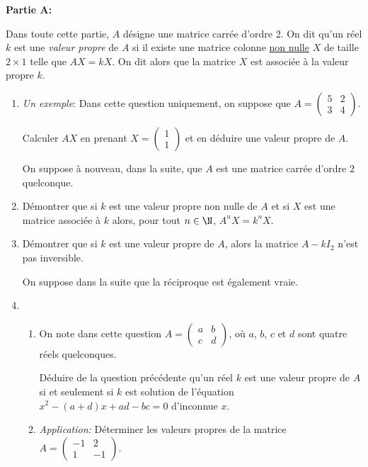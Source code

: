 \documentclass[a4paper]{article}
\begin{document}
\begin{exercice}{}{}

    \textbf{Partie A:}

    Dans toute cette partie, $A$ désigne une matrice carrée d'ordre 2. On dit qu'un réel $k$ est une \textit{valeur propre} de $A$ si il existe une matrice colonne \underline{non nulle} $X$ de taille $2\times 1$ telle que $AX=kX$. On dit alors que la matrice $X$ est associée à la valeur propre $k$.

    \begin{enumerate}
        \item \textit{Un exemple}: Dans cette question uniquement, on suppose que $A=\begin{pmatrix} 5 & 2 \\ 3 & 4  \end{pmatrix}$.
        
        Calculer $AX$ en prenant $X=\begin{pmatrix} 1 \\ 1 \end{pmatrix}$ et en déduire une valeur propre de $A$.

        On suppose à nouveau, dans la suite, que $A$ est une matrice carrée d'ordre $2$ quelconque.

        \item Démontrer que si $k$ est une valeur propre non nulle de $A$ et si $X$ est une matrice associée à $k$ alors, pour tout $n\in\N$, $A^nX=k^nX$.
        \item Démontrer que si $k$ est une valeur propre de $A$, alors la matrice $A-kI_2$ n'est pas inversible.

        On suppose dans la suite que la réciproque est également vraie.

        \item \begin{enumerate}
            \item On note dans cette question $A=\begin{pmatrix} a & b \\ c & d  \end{pmatrix}$, où $a$, $b$, $c$ et $d$ sont quatre réels quelconques.
            
            Déduire de la question précédente qu'un réel $k$ est une valeur propre de $A$ si et seulement si $k$ est solution de l'équation $x^2-(a+d)x+ad-bc=0$ d'inconnue $x$.

            \item \textit{Application:} Déterminer les valeurs propres de la matrice $A=\begin{pmatrix} -1 & 2 \\ 1 & -1  \end{pmatrix}$.
            

\end{enumerate}
\end{enumerate}
\end{exercice}
\end{document}
